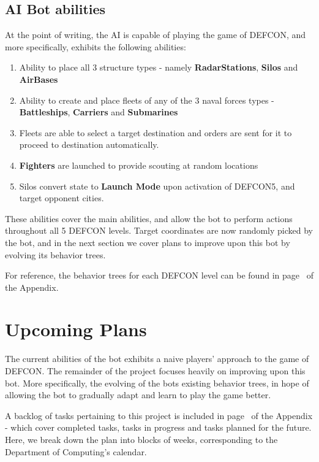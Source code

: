     \subsection{AI Bot abilities} 

    At the point of writing, the AI is capable of playing the game of DEFCON, and more specifically, exhibits the following abilities:
    
    \begin{enumerate}
    \item Ability to place all 3 structure types - namely \textbf{RadarStations}, \textbf{Silos} and \textbf{AirBases}
    \item Ability to create and place fleets of any of the 3 naval forces types - \textbf{Battleships}, \textbf{Carriers} and \textbf{Submarines}
    \item Fleets are able to select a target destination and orders are sent for it to proceed to destination automatically.
    \item \textbf{Fighters} are launched to provide scouting at random locations
    \item Silos convert state to \textbf{Launch Mode} upon activation of DEFCON5, and target opponent cities.
    \end{enumerate}
    
    These abilities cover the main abilities, and allow the bot to perform actions throughout all 5 DEFCON levels. Target coordinates are now randomly picked by the bot, and in the next section we cover plans to improve upon this bot by evolving its behavior trees. 
    
    For reference, the behavior trees for each DEFCON level can be found in page~\pageref{app:defconbts} of the Appendix.
    
    \section{Upcoming Plans}
    
    The current abilities of the bot exhibits a naive players' approach to the game of DEFCON. The remainder of the project focuses heavily on improving upon this bot. More specifically, the evolving of the bots existing behavior trees, in hope of allowing the bot to gradually adapt and learn to play the game better. 
    
    A backlog of tasks pertaining to this project is included in page~\pageref{app:backlog} of the Appendix - which cover completed tasks, tasks in progress and tasks planned for the future. Here, we break down the plan into blocks of weeks, corresponding to the Department of Computing's calendar.
    

